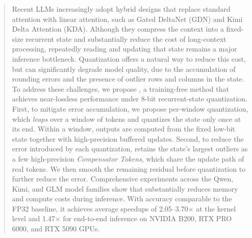 \begin{abstract}

Recent LLMs increasingly adopt hybrid designs that replace standard attention with linear attention, such as Gated DeltaNet (GDN) and Kimi Delta Attention (KDA).
Although they compress the context into a fixed-size recurrent state and substantially reduce the cost of long-context processing, repeatedly reading and updating that state remains a major inference bottleneck.
Quantization offers a natural way to reduce this cost, but can significantly degrade model quality, due to the accumulation of rounding errors and the presence of outlier rows and columns in the state.
To address these challenges, we propose \emph{\method{}}, a training-free method that achieves near-lossless performance under 8-bit recurrent-state quantization.
First, to mitigate error accumulation, we propose per-window quantization, which \emph{leaps} over a window of tokens and quantizes the state only once at its end.
Within a window, outputs are computed from the fixed low-bit state together with high-precision buffered updates.
Second, to reduce the error introduced by each quantization, \method{} retains the state's largest outliers as a few high-precision \emph{Compensator Tokens}, which share the update path of real tokens.
We then smooth the remaining residual before quantization to further reduce the error.
Comprehensive experiments across the Qwen, Kimi, and GLM model families show that \emph{\method{}} substantially reduces memory and compute costs during inference.
With accuracy comparable to the FP32 baseline, it achieves average speedups of 2.05--3.70$\times$ at the kernel level and 1.47$\times$ for end-to-end inference on NVIDIA B200, RTX PRO 6000, and RTX 5090 GPUs.

\end{abstract}

